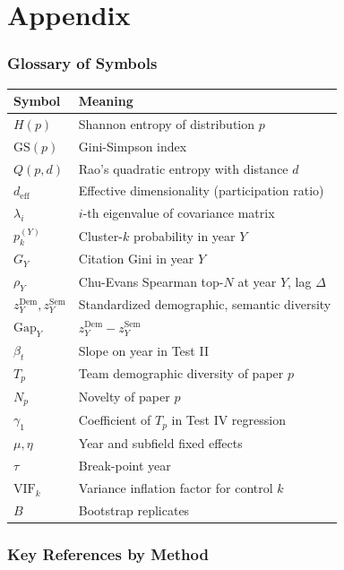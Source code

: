 \documentclass[11pt]{article}
\begin{document}
\clearpage
\part*{Appendix}

\section*{Glossary of Symbols}

\begin{tabular}{ll}
  \toprule
  Symbol & Meaning \\
  \midrule
  $H(p)$ & Shannon entropy of distribution $p$ \\
  $\text{GS}(p)$ & Gini-Simpson index \\
  $Q(p, d)$ & Rao's quadratic entropy with distance $d$ \\
  $d_{\text{eff}}$ & Effective dimensionality (participation ratio) \\
  $\lambda_i$ & $i$-th eigenvalue of covariance matrix \\
  $p_k^{(Y)}$ & Cluster-$k$ probability in year $Y$ \\
  $G_Y$ & Citation Gini in year $Y$ \\
  $\rho_Y$ & Chu-Evans Spearman top-$N$ at year $Y$, lag $\Delta$ \\
  $z^{\text{Dem}}_Y, z^{\text{Sem}}_Y$ & Standardized demographic, semantic diversity \\
  $\text{Gap}_Y$ & $z^{\text{Dem}}_Y - z^{\text{Sem}}_Y$ \\
  $\beta_t$ & Slope on year in Test II \\
  $T_p$ & Team demographic diversity of paper $p$ \\
  $N_p$ & Novelty of paper $p$ \\
  $\gamma_1$ & Coefficient of $T_p$ in Test IV regression \\
  $\mu, \eta$ & Year and subfield fixed effects \\
  $\tau$ & Break-point year \\
  $\text{VIF}_k$ & Variance inflation factor for control $k$ \\
  $B$ & Bootstrap replicates \\
  \bottomrule
\end{tabular}

\section*{Key References by Method}
\end{document}
